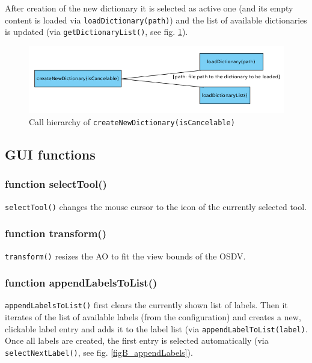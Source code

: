 After creation of the new dictionary it is selected as active one (and its empty content is loaded via \texttt{loadDictionary(path)}) and the list of available dictionaries is updated (via \texttt{getDictionaryList()}, see fig. \ref{figB_createDict}).

\begin{figure}[H]
	\begin{center}
		\includegraphics[scale=0.45]{img/ch_createDict.png}
		\caption{Call hierarchy of \texttt{createNewDictionary(isCancelable)}}
		\label{figB_createDict}
	\end{center}
\end{figure}


\subsection{GUI functions}

\subsubsection{function selectTool()}
\texttt{selectTool()} changes the mouse cursor to the icon of the currently selected tool.


\subsubsection{function transform()}
\texttt{transform()} resizes the AO to fit the view bounds of the OSDV.


\subsubsection{function appendLabelsToList()}
\texttt{appendLabelsToList()} first clears the currently shown list of labels. Then it iterates of the list of available labels (from the configuration) and creates a new, clickable label entry and adds it to the label list (via \texttt{appendLabelToList(label)}. Once all labels are created, the first entry is selected automatically (via \texttt{selectNextLabel()}, see fig. \ref{figB_appendLabels}).

